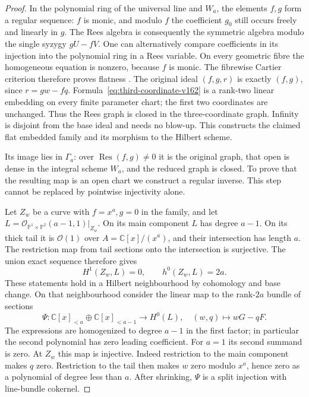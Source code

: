 \documentclass[11pt,reqno]{amsart}
\numberwithin{equation}{section}
\theoremstyle{definition}\newtheorem{definition}[theorem]{Definition}
\theoremstyle{remark}\newtheorem{remark}[theorem]{Remark}
\newcommand{\C}{\mathbb C}\newcommand{\Q}{\mathbb Q}
\newcommand{\Pj}{\mathbb P}\newcommand{\A}{\mathbb A}
\newcommand{\OO}{\mathcal O}\newcommand{\II}{\mathcal I}
\begin{document}
\begin{proof}
In the polynomial ring of the universal line and $W_a$, the elements
$f,g$ form a regular sequence: $f$ is monic, and modulo $f$ the
coefficient $g_0$ still occurs freely and linearly in $g$. The Rees
algebra is consequently the symmetric algebra modulo the single
syzygy $gU-fV$. One can alternatively compare coefficients in its
injection into the polynomial ring in a Rees variable. On every
geometric fibre the homogeneous equation is nonzero, because $f$
is monic. The fibrewise Cartier criterion therefore proves flatness
\cite[Tag~062Y, part~(3)]{Stacks162}. The original ideal $(f,g,r)$ is exactly
$(f,g)$, since $r=gw-fq$. Formula~\eqref{eq:third-coordinate-v162}
is a rank-two linear embedding on every finite parameter chart;
the first two coordinates are unchanged. Thus the Rees graph is
closed in the three-coordinate graph. Infinity is disjoint from
the base ideal and needs no blow-up. This constructs the claimed
flat embedded family and its morphism to the Hilbert scheme.

Its image lies in $\Gamma_a$: over $\operatorname{Res}(f,g)\ne0$
it is the original graph, that open is dense in the integral scheme
$W_a$, and the reduced graph is closed. To prove that the resulting
map is an open chart we construct a regular inverse. This step
cannot be replaced by pointwise injectivity alone.

Let $Z_w$ be a curve with $f=x^a,g=0$ in the family, and let
$L=\OO_{\Pj^1\times\Pj^2}(a-1,1)|_{Z_w}$. On its main component
$L$ has degree $a-1$. On its thick tail it is $\OO(1)$ over
$A=\C[x]/(x^a)$, and their intersection has length $a$. The
restriction map from tail sections onto the intersection is
surjective. The union exact sequence therefore gives
\begin{equation}\label{eq:chart-cohomology-v162}
                    H^1(Z_w,L)=0,\qquad h^0(Z_w,L)=2a.
\end{equation}
These statements hold in a Hilbert neighbourhood by cohomology and
base change. On that neighbourhood consider the linear map to the
rank-$2a$ bundle of sections
\begin{equation}\label{eq:division-recovery-v162}
 \Psi:\C[x]_{<a}\oplus\C[x]_{<a-1}\longrightarrow H^0(L),
                   \quad (w,q)\longmapsto wG-qF.
\end{equation}
The expressions are homogenized to degree $a-1$ in the first factor;
in particular the second polynomial has zero leading coefficient.
For $a=1$ its second summand is zero. At $Z_w$ this map is injective.
Indeed restriction to the main component makes $q$ zero. Restriction
to the tail then makes $w$ zero modulo $x^a$, hence zero as a
polynomial of degree less than $a$. After shrinking, $\Psi$ is a
split injection with line-bundle cokernel.


\end{proof}
\end{document}

